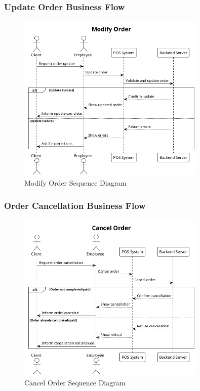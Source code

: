 \documentclass[]{VUMIFTemplateClass}
\begin{document}
\subsubsection{Update Order Business Flow}


\begin{figure}[H]
    \centering
    \includegraphics[width=0.8\textwidth]{images/diagrams/orders/order_modify_order_sequence.png}
    \caption{Modify Order Sequence Diagram}
    \label{fig:modify_order_sequence}
\end{figure}

\subsubsection{Order Cancellation Business Flow}


\begin{figure}[H]
    \centering
    \includegraphics[width=0.8\textwidth]{images/diagrams/orders/order_cancel_order_sequence.png}
    \caption{Cancel Order Sequence Diagram}
    \label{fig:cancel_order_sequence}
\end{figure}
\end{document}
